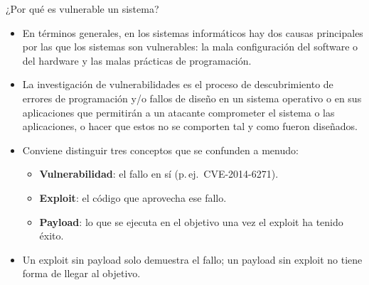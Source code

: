 \documentclass[aspectratio=169,11pt]{beamer}
\begin{document}
\begin{frame}{¿Por qué es vulnerable un sistema?}
\small
  \begin{itemize}\setlength{\itemsep}{0.5em}
  \item En términos generales, en los sistemas informáticos hay dos causas principales por las que los sistemas son vulnerables: la mala configuración del software o del hardware y las malas prácticas de programación.
  \item La investigación de vulnerabilidades es el proceso de descubrimiento de errores de programación y/o fallos de diseño en un sistema operativo o en sus aplicaciones que permitirán a un atacante comprometer el sistema o las aplicaciones, o hacer que estos no se comporten tal y como fueron diseñados.
  \item Conviene distinguir tres conceptos que se confunden a menudo:
    \begin{itemize}\setlength{\itemsep}{0.25em}
    \item \textbf{Vulnerabilidad}: el fallo en sí (p.\,ej.\ CVE-2014-6271).
    \item \textbf{Exploit}: el código que aprovecha ese fallo.
    \item \textbf{Payload}: lo que se ejecuta en el objetivo una vez el exploit ha tenido éxito.
    \end{itemize}
  \item Un exploit sin payload solo demuestra el fallo; un payload sin exploit no tiene forma de llegar al objetivo.
  \end{itemize}
\end{frame}
\end{document}
